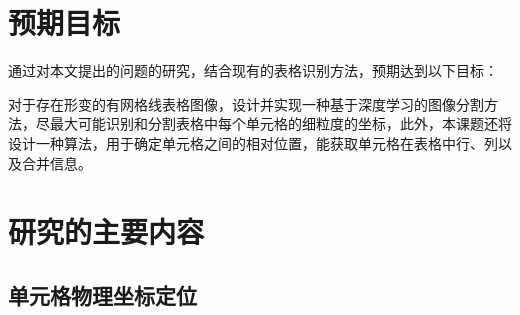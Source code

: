 \documentclass[UTF8,12pt, AutoFakeBold,fontset = founder]{ctexart}
\begin{document}


\section{预期目标}

通过对本文提出的问题的研究，结合现有的表格识别方法，预期达到以下目标：

对于存在形变的有网格线表格图像，设计并实现一种基于深度学习的图像分割方法，尽最大可能识别和分割表格中每个单元格的细粒度的坐标，此外，本课题还将设计一种算法，用于确定单元格之间的相对位置，能获取单元格在表格中行、列以及合并信息。

\section{研究的主要内容}
\subsection{单元格物理坐标定位}
\end{document}
